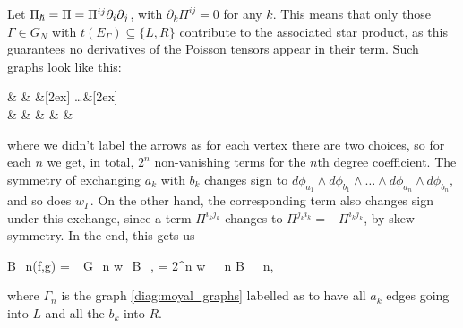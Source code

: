 \documentclass[main.tex]{subfiles}
\begin{document}
\begin{example}
	Let $\Pi_{\boldsymbol\hslash} = \Pi = \Pi^{ij} \partial_i \partial_j$, with $\partial_k \Pi^{ij} = 0$ for any $k$. This means that only those $\Gamma \in G_N$ with $t(E_\Gamma) \subseteq \{L,R\}$ contribute to the associated star product, as this guarantees no derivatives of the Poisson tensors appear in their term. Such graphs look like this:
	\begin{diagram}
	\label{diag:moyal_graphs}
		\& \bullet {}  \& \bullet {}  \&[2ex] \dots \&[2ex] \bullet {} \\
		\bullet \& \& \& \& \& \bullet
	\end{diagram}
	where we didn't label the arrows as for each vertex there are two choices, so for each $n$ we get, in total, $2^n$ non-vanishing terms for the $n$th degree coefficient. The symmetry of exchanging $a_k$ with $b_k$ changes sign to $d\phi_{a_1} \wedge d \phi_{b_1} \wedge \ldots \wedge d\phi_{a_n} \wedge d\phi_{b_n}$, and so does $w_\Gamma$. On the other hand, the corresponding term also changes sign under this exchange, since a term $\Pi^{i_kj_k}$ changes to $\Pi^{j_ki_k} = - \Pi^{i_kj_k}$, by skew-symmetry. In the end, this gets us
	\begin{eqalign}
		B_n(f,g) =  \sum_{\Gamma \in G_n} w_\Gamma B_{\Gamma, \Pi} = 2^n w_{\Gamma_n} B_{\Gamma_n,\Pi}
	\end{eqalign}
	where $\Gamma_n$ is the graph \eqref{diag:moyal_graphs} labelled as to have all $a_k$ edges going into $L$ and all the $b_k$ into $R$.


\end{example}
\end{document}
